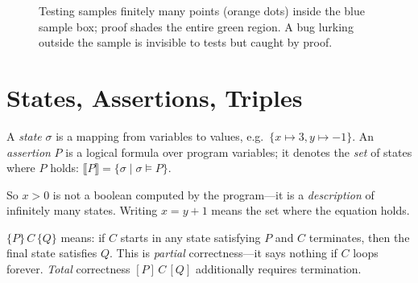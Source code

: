 \begin{figure}[h]\centering
{}
\caption{Testing samples finitely many points (orange dots) inside the blue sample box; proof shades the entire green region. A bug lurking outside the sample is invisible to tests but caught by proof.}
\label{fig:test-vs-proof}
\end{figure}

\section{States, Assertions, Triples}
\label{sec:states}
\begin{definition}
A \emph{state} $\sigma$ is a mapping from variables to values, e.g.\ $\{x\mapsto 3,y\mapsto -1\}$. An \emph{assertion} $P$ is a logical formula over program variables; it denotes the \emph{set} of states where $P$ holds: $\llbracket P\rrbracket=\{\sigma\mid \sigma\models P\}$.
\end{definition}

So $x>0$ is not a boolean computed by the program—it is a \emph{description} of infinitely many states. Writing $x=y+1$ means the set where the equation holds.

\begin{definition}
$\{P\}\,C\,\{Q\}$ means: if $C$ starts in any state satisfying $P$ and $C$ terminates, then the final state satisfies $Q$. This is \emph{partial} correctness—it says nothing if $C$ loops forever. \emph{Total} correctness $[P]\,C\,[Q]$ additionally requires termination.
\end{definition}

